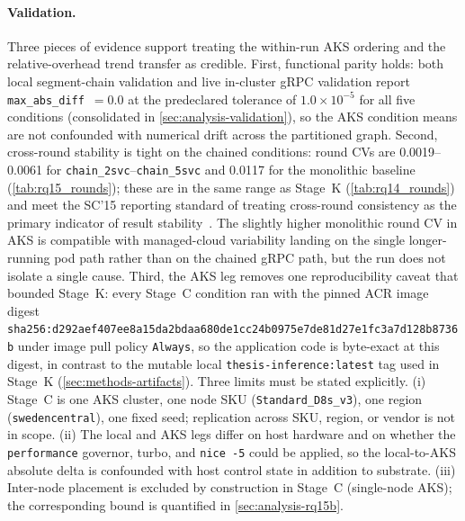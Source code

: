 \paragraph{Validation.}
Three pieces of evidence support treating the within-run AKS ordering
and the relative-overhead trend transfer as credible. First, functional
parity holds: both local segment-chain validation and live in-cluster
gRPC validation report \texttt{max\_abs\_diff}~$=0.0$ at the predeclared
tolerance of $1.0\times10^{-5}$ for all five conditions
(consolidated in \cref{sec:analysis-validation}), so the AKS condition
means are not confounded with numerical drift across the partitioned
graph. Second, cross-round stability is tight on the chained conditions:
round CVs are 0.0019--0.0061 for
\texttt{chain\_2svc}--\texttt{chain\_5svc} and 0.0117 for the monolithic
baseline (\cref{tab:rq15_rounds}); these are in the same range as Stage~K
(\cref{tab:rq14_rounds}) and meet the SC'15 reporting standard of
treating cross-round consistency as the primary indicator of result
stability~\cite{benchmarking_sc15}. The slightly higher monolithic round
CV in AKS is compatible with managed-cloud variability landing on the
single longer-running pod path rather than on the chained gRPC path,
but the run does not isolate a single cause. Third, the AKS leg removes
one reproducibility caveat that bounded Stage~K: every Stage~C condition
ran with the pinned ACR image digest
\texttt{sha256:d292aef407ee8a15da2b}\allowbreak\texttt{daa680de1cc24b0975e7de81d27e1fc3}\allowbreak\texttt{a7d128b8736b}
under image pull policy \texttt{Always}, so the application code is
byte-exact at this digest, in contrast to the mutable local
\texttt{thesis-inference:latest} tag used in Stage~K
(\cref{sec:methods-artifacts}). Three limits must be stated explicitly.
(i) Stage~C is one AKS cluster, one node SKU (\texttt{Standard\_D8s\_v3}),
one region (\texttt{swedencentral}), one fixed seed; replication across
SKU, region, or vendor is not in scope. (ii) The local and AKS legs
differ on host hardware and on whether the \texttt{performance}
governor, turbo, and \texttt{nice~-5} could be applied, so the
local-to-AKS absolute delta is confounded with host control state in
addition to substrate. (iii) Inter-node placement is excluded by
construction in Stage~C (single-node AKS); the corresponding bound is
quantified in \cref{sec:analysis-rq15b}.

